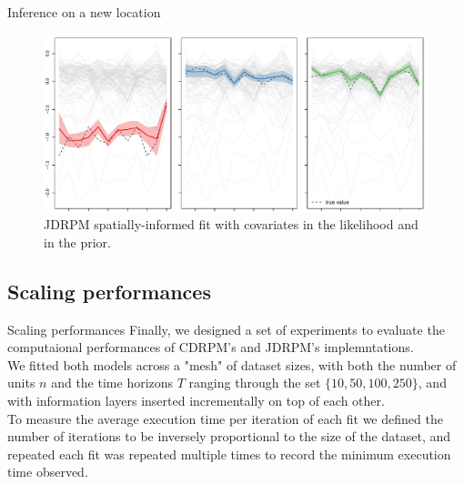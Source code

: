 \documentclass[
	11pt, %
 xcolor={dvipsnames,svgnames}
]{beamer}
\begin{document}
\begin{frame}{Inference on a new location}
\begin{figure}
\centering
    \includegraphics[width=1\linewidth]{Testing/new kriking/JDRPM - NA fit - space + Xlk + Xcl_VERTICAL_BLACK.pdf}
    \caption[Inference analysis of JDRPM on new locations, spatial information, covariates in the likelihood and in the prior]{JDRPM spatially-informed fit with covariates in the likelihood and in the prior.}
\end{figure}
\end{frame}



\subsection{Scaling performances}

\begin{frame}{Scaling performances}
Finally, we designed a set of experiments to evaluate the computaional performances of CDRPM's and JDRPM's implemntations.\\[6pt]
We fitted both models across a "mesh" of dataset sizes, with both the number of units $n$ and the time horizons $T$ ranging through the set $\{10, 50, 100, 250\}$, and with information layers inserted incrementally on top of each other.\\[6pt]
To measure the average execution time per iteration of each fit we defined the number of iterations to be inversely proportional to the size of the dataset, and repeated each fit was repeated multiple times to record the minimum execution time observed. 

\end{frame}
\end{document}
